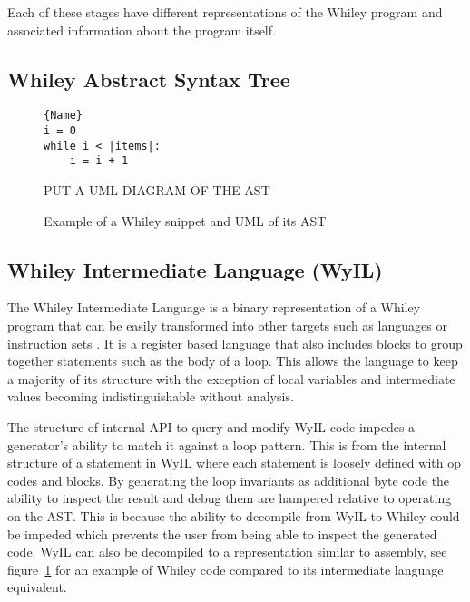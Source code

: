 Each of these stages have different representations of the Whiley program and
associated information about the program itself.

\subsection{Whiley Abstract Syntax Tree}



\begin{figure}
\noindent\begin{minipage}{.45\textwidth}
\begin{lstlisting}[caption={Whiley Code},frame=tlrb,numbers=none]{Name}
i = 0
while i < |items|:
    i = i + 1
\end{lstlisting}
\end{minipage}\hfill
\begin{minipage}{.45\textwidth}
    PUT A UML DIAGRAM OF THE AST
\end{minipage}
    \label{lst:design-wyil}
    \caption{Example of a Whiley snippet and UML of its AST}
\end{figure}

\subsection{Whiley Intermediate Language (WyIL)}

The Whiley Intermediate Language is a binary representation of a Whiley program
that can be easily transformed into other targets such as languages or
instruction sets \cite{wyil}.
It is a register based language that also includes blocks to group together
statements such as the body of a loop.
This allows the language to keep a majority of its structure with the 
exception of local variables and intermediate values becoming indistinguishable 
without analysis.

The structure of internal API to query and modify WyIL code impedes a
generator's ability to match it against a loop pattern.
This is from the internal structure of a statement in WyIL where each
statement is loosely defined with op codes and blocks.
By generating the loop invariants as additional byte code the ability to
inspect the result and debug them are hampered relative to operating on the
AST.  This is because the ability to decompile from WyIL to Whiley could
be impeded which prevents the user from being able to inspect the generated
code. 
WyIL can also be decompiled to a representation similar to assembly, see
figure~\ref{lst:design-wyil} for an example of Whiley code compared to its
intermediate language equivalent.


